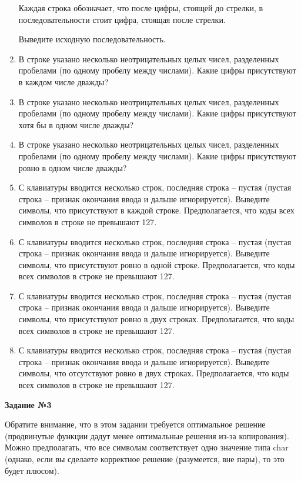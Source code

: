 \begin{enumerate}
Каждая строка обозначает, что после цифры, стоящей до стрелки, в последовательности стоит цифра, стоящая после стрелки. 

Выведите исходную последовательность.

\item В строке указано несколько неотрицательных целых чисел, разделенных пробелами (по одному
пробелу между числами). Какие цифры присутствуют в каждом числе дважды?

\item В строке указано несколько неотрицательных целых чисел, разделенных пробелами (по одному
пробелу между числами). Какие цифры присутствуют хотя бы в одном числе дважды?

\item В строке указано несколько неотрицательных целых чисел, разделенных пробелами (по одному
пробелу между числами). Какие цифры присутствуют ровно в одном числе дважды?

\item С клавиатуры вводится несколько строк, последняя строка -- пустая (пустая строка -- признак окончания ввода и дальше игнорируется). Выведите символы, что присутствуют в каждой строке. Предполагается, что коды всех символов в строке не превышают 127.

\item С клавиатуры вводится несколько строк, последняя строка -- пустая (пустая строка -- признак окончания ввода и дальше игнорируется). Выведите символы, что присутствуют ровно в одной строке. 
Предполагается, что коды всех символов в строке не превышают 127.

\item С клавиатуры вводится несколько строк, последняя строка -- пустая (пустая строка -- признак окончания ввода и дальше игнорируется). Выведите символы, что присутствуют ровно в двух строках.
Предполагается, что коды всех символов в строке не превышают 127.


\item С клавиатуры вводится несколько строк, последняя строка -- пустая (пустая строка -- признак окончания ввода и дальше игнорируется). Выведите символы, что отсутствуют ровно в двух строках.
Предполагается, что коды всех символов в строке не превышают 127.



\end{enumerate}

\textbf{Задание №3}

Обратите внимание, что в этом задании требуется оптимальное решение 
(продвинутые функции дадут менее оптимальные решения из-за копирования). Можно предполагать,
что все символам соответствует одно значение типа char (однако,
если вы сделаете корректное решение (разумеется, вне пары), то это будет плюсом).

